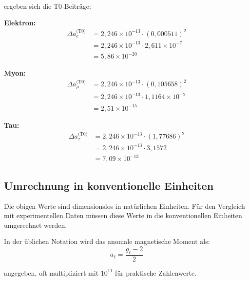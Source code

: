 	ergeben sich die T0-Beiträge:
	
	\textbf{Elektron:}
	\begin{equation}
		\begin{split}
			\Delta a_e^{\text{(T0)}} &= 2{,}246 \times 10^{-13} \cdot (0{,}000511)^2 \\
			&= 2{,}246 \times 10^{-13} \cdot 2{,}611 \times 10^{-7} \\
			&= 5{,}86 \times 10^{-20}
		\end{split}
		\label{eq:electron_prediction}
	\end{equation}
	
	\textbf{Myon:}
	\begin{equation}
		\begin{split}
			\Delta a_\mu^{\text{(T0)}} &= 2{,}246 \times 10^{-13} \cdot (0{,}105658)^2 \\
			&= 2{,}246 \times 10^{-13} \cdot 1{,}1164 \times 10^{-2} \\
			&= 2{,}51 \times 10^{-15}
		\end{split}
		\label{eq:muon_prediction}
	\end{equation}
	
	\textbf{Tau:}
	\begin{equation}
		\begin{split}
			\Delta a_\tau^{\text{(T0)}} &= 2{,}246 \times 10^{-13} \cdot (1{,}77686)^2 \\
			&= 2{,}246 \times 10^{-13} \cdot 3{,}1572 \\
			&= 7{,}09 \times 10^{-13}
		\end{split}
		\label{eq:tau_prediction}
	\end{equation}
	
	\subsection{Umrechnung in konventionelle Einheiten}
	
	Die obigen Werte sind dimensionslos in natürlichen Einheiten. Für den Vergleich mit experimentellen Daten müssen diese Werte in die konventionellen Einheiten umgerechnet werden.
	
	In der üblichen Notation wird das anomale magnetische Moment als:
	\begin{equation}
		a_\ell = \frac{g_\ell - 2}{2}
		\label{eq:conventional_definition}
	\end{equation}
	
	angegeben, oft multipliziert mit $10^{11}$ für praktische Zahlenwerte.
	
